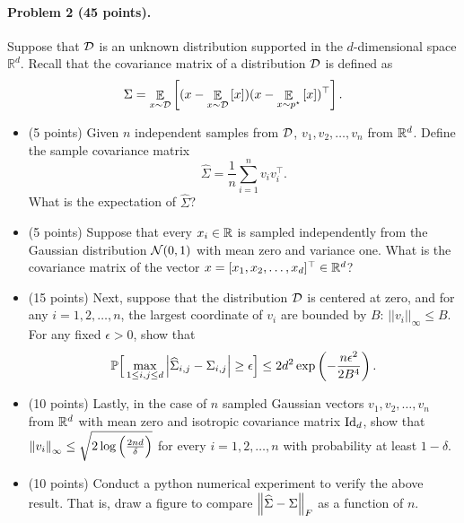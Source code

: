 \documentclass[11pt]{article}
\begin{document}
\paragraph{Problem 2 (45 points).}
Suppose that $\mathcal{D}$ is an unknown distribution supported in the $d$-dimensional space $\mathbb{R}^d$.
Recall that the covariance matrix of a distribution $\mathcal{D}$ is defined as
\[ \Sigma = \mathop{\mathbb{E}}_{x\sim \mathcal{D}}\left[ (x - \mathop{\mathbb{E}}_{x\sim \mathcal{D}}\left[ x \right])(x-\mathop{\mathbb{E}}_{x\sim p^{\star}}\left[ x \right])^\top  \right]. \]
\begin{itemize}
    \item (5 points) Given $n$ independent samples from $\mathcal{D}$, $v_1, v_2, \dots, v_n$ from $\mathbb{R}^d$. Define the sample covariance matrix
    \[ \widehat{\Sigma} = \frac{1}{n}\sum_{i = 1}^n v_i v_i^{\top}. \]
    What is the expectation of $\widehat \Sigma$?
    
    \item (5 points) Suppose that every $x_i \in \mathbb{R}$ is sampled independently from the Gaussian distribution $\mathcal{N}(0, 1)$ with mean zero and variance one. What is the covariance matrix of the vector $x = [x_1, x_2, \dots, x_d]^{\top} \in \mathbb{R}^d$?
   
    \item (15 points) Next, suppose that the distribution $\mathcal{D}$ is centered at zero, and for any $i = 1,2,\dots,n$, the largest coordinate of $v_i$ are bounded by $B$: $||v_i||_{\infty}\leq B$.
    For any fixed $\epsilon > 0$, show that
    \[ \mathbb{P}\Big{[}\max_{1\leq i,j\leq d}{\left| {\widehat{\Sigma}_{i, j} - \Sigma_{i, j}} \right|}\geq \epsilon\Big{]}\leq 2d^2\exp \left(-\frac{n\epsilon^2}{2B^4}\right). \]

    \item (10 points) Lastly, in the case of $n$ sampled Gaussian vectors $v_1, v_2, \dots, v_n$ from $\mathbb{R}^d$ with mean zero and isotropic covariance matrix $\operatorname{Id}_d$, show that $\left\| v_i \right\|_\infty \le \sqrt{2 \log\Big(\frac{2nd}{\delta} \Big)}$ for every $i = 1, 2, \dots, n$ with probability at least $1 - \delta$.

    \item (10 points) Conduct a python numerical experiment to verify the above result. That is, draw a figure to compare $\left\| \widehat \Sigma - \Sigma \right\|_{F}$ as a function of $n$.
\end{itemize}

\newpage
\end{document}
